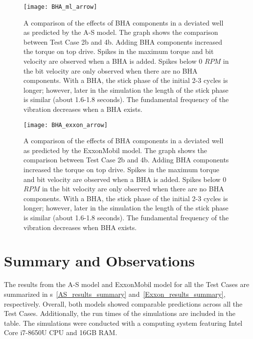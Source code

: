 \begin{figure}
  \centering
  \texttt{[image: BHA\_ml\_arrow]}
  \caption[Effects of BHA components in a deviated well from the A-S model]{A comparison of the effects of BHA components in a deviated well as predicted by the A-S model. The graph shows the comparison between Test Case 2b and 4b. Adding BHA components increased the torque on top drive. Spikes in the maximum torque and bit velocity are observed when a BHA is added. Spikes below 0 $RPM$ in the bit velocity are only observed when there are no BHA components. With a BHA, the stick phase of the initial 2-3 cycles is longer; however, later in the simulation the length of the stick phase is similar (about 1.6-1.8 seconds). The fundamental frequency of the vibration decreases when a BHA exists.}\label{figure_BHA_Matlab}
\end{figure}

\begin{figure}
  \centering
  \texttt{[image: BHA\_exxon\_arrow]}
  \caption[Effects of BHA components in a deviated well from the ExxonMobil model]{A comparison of the effects of BHA components in a deviated well as predicted by the ExxonMobil model. The graph shows the comparison between Test Case 2b and 4b. Adding BHA components increased the torque on top drive. Spikes in the maximum torque and bit velocity are observed when a BHA is added. Spikes below 0 $RPM$ in the bit velocity are only observed when there are no BHA components. With a BHA, the stick phase of the initial 2-3 cycles is longer; however, later in the simulation the length of the stick phase is similar (about 1.6-1.8 seconds). The fundamental frequency of the vibration decreases when BHA exists.}\label{figure_BHA_EXXON}
\end{figure}

\section{Summary and Observations}
The results from the A-S model and ExxonMobil model for all the Test Cases are summarized in \tablename{}s~\ref{AS_results_summary} and~\ref{Exxon_results_summary}, respectively. Overall, both models showed comparable predictions across all the Test Cases. Additionally, the run times of the simulations are included in the table.  The simulations were conducted with a computing system featuring Intel\textsuperscript{\textregistered} Core\textsuperscript{\texttrademark} i7-8650U CPU and 16GB RAM\@.


